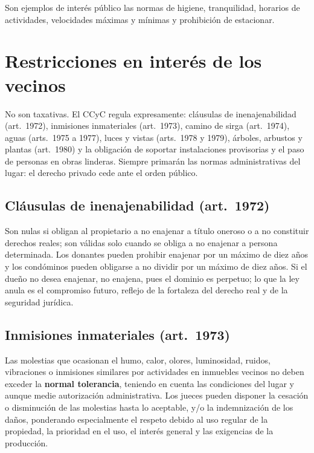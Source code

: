 \documentclass[12pt,oneside]{book}
\begin{document}
Son ejemplos de interés público las normas de higiene, tranquilidad, horarios de actividades, velocidades máximas y mínimas y prohibición de estacionar.

\section{Restricciones en interés de los vecinos}

No son taxativas. El CCyC regula expresamente: cláusulas de inenajenabilidad (art.~1972), inmisiones inmateriales (art.~1973), camino de sirga (art.~1974), aguas (arts.~1975 a 1977), luces y vistas (arts.~1978 y 1979), árboles, arbustos y plantas (art.~1980) y la obligación de soportar instalaciones provisorias y el paso de personas en obras linderas. Siempre primarán las normas administrativas del lugar: el derecho privado cede ante el orden público.

\subsection{Cláusulas de inenajenabilidad (art.~1972)}

Son nulas si obligan al propietario a no enajenar a título oneroso o a no constituir derechos reales; son válidas solo cuando se obliga a no enajenar a persona determinada. Los donantes pueden prohibir enajenar por un máximo de diez años y los condóminos pueden obligarse a no dividir por un máximo de diez años. Si el dueño no desea enajenar, no enajena, pues el dominio es perpetuo; lo que la ley anula es el compromiso futuro, reflejo de la fortaleza del derecho real y de la seguridad jurídica.

\subsection{Inmisiones inmateriales (art.~1973)}

Las molestias que ocasionan el humo, calor, olores, luminosidad, ruidos, vibraciones o inmisiones similares por actividades en inmuebles vecinos no deben exceder la \textbf{normal tolerancia}, teniendo en cuenta las condiciones del lugar y aunque medie autorización administrativa. Los jueces pueden disponer la cesación o disminución de las molestias hasta lo aceptable, y/o la indemnización de los daños, ponderando especialmente el respeto debido al uso regular de la propiedad, la prioridad en el uso, el interés general y las exigencias de la producción.
\end{document}
